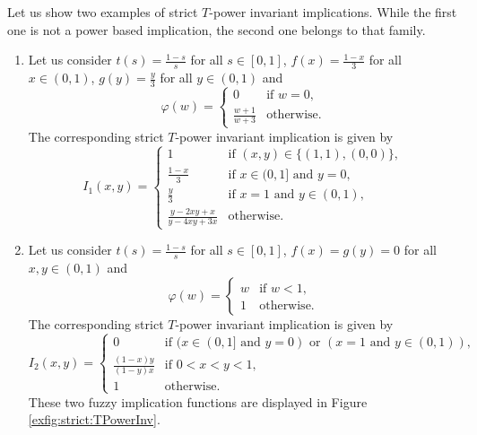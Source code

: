 \begin{example}\label{ex:strict:TPowerInv} Let us show two examples of strict $T$-power invariant implications. While the first one is not a power based implication, the second one belongs to that family.
	\begin{enumerate}[label=(\roman*)]
		\item Let us consider $t(s)=\frac{1-s}{s}$ for all $s \in [0,1]$, $f(x)=\frac{1-x}{3}$ for all $x \in (0,1)$, $g(y)=\frac{y}{3}$ for all $y \in(0,1)$  and
		$$\varphi(w)= \left\{ \begin{array}{ll}
			0 &   \text{if }   w=0, \\
			\frac{w+1}{w+3} &  \text{otherwise}. 	\end{array}
		\right.
		$$
		The corresponding strict $T$-power invariant implication is given by
		\begin{equation*}
			I_1(x,y) =\left\{ \begin{array}{ll}
				1 & \text{if } (x,y) \in \{(1,1),(0,0)\},\\
				\frac{1-x}{3} &   \text{if }   x \in (0,1] \text{ and } y=0, \\
				\frac{y}{3} &  \text{if }  x = 1 \text{ and } y\in (0,1), \\
				\frac{y-2xy+x}{y-4xy+3x} &  \text{otherwise}.
			\end{array}
			\right.
		\end{equation*}
		\item Let us consider $t(s)=\frac{1-s}{s}$ for all $s \in [0,1]$, $f(x)=g(y)=0$ for all $x,y \in (0,1)$ and 
		$$\varphi(w)= \left\{ \begin{array}{ll}
			w &   \text{if }   w < 1, \\
			1 &  \text{otherwise}. 	\end{array}
		\right.
		$$
		The corresponding strict $T$-power invariant implication is given by
		\begin{equation*}
			I_2(x,y) =\left\{ \begin{array}{ll}
				0 &   \text{if }   (x \in (0,1] \text{ and } y=0) \text{ or } (x = 1 \text{ and } y\in (0,1)), \\
				\frac{(1-x)y}{(1-y)x} & \text{if }   0<x<y<1,\\
				1 &  \text{otherwise}.
			\end{array}
			\right.
		\end{equation*}
		These two fuzzy implication functions are displayed in Figure \ref{exfig:strict:TPowerInv}.		
		\begin{figure}

\end{figure}
\end{enumerate}
\end{example}
